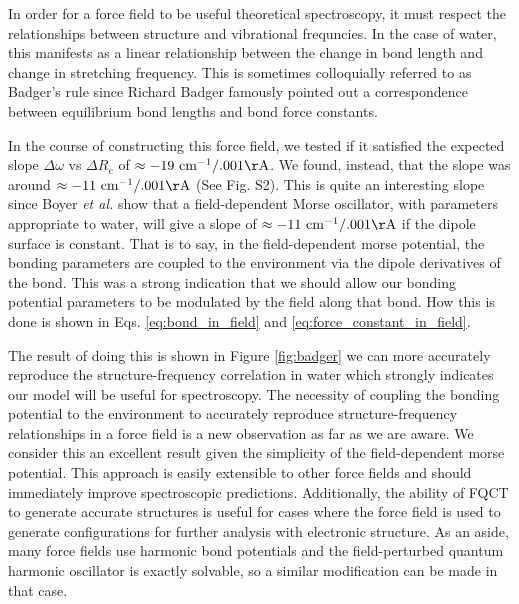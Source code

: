 \documentclass[journal=jacsat,manuscript=article]{achemso}
\begin{document}
In order for a force field to be useful theoretical spectroscopy, it must respect the relationships
between structure and vibrational frequncies. In the case of water, this manifests as a linear
relationship between the change in bond length and change in  stretching frequency.\cite{boyer2019beyond}
This is sometimes colloquially referred to as Badger's rule since Richard Badger famously pointed out a
correspondence between equilibrium bond lengths and bond force constants.\cite{badger1934relation}

In the course of constructing this force field, we tested if it satisfied the expected slope
$\Delta\omega$ vs $\Delta R_e$ of $\approx -19\ \mathrm{cm^{-1}/.001\AA}$\cite{boyer2019beyond}.
We found, instead, that the slope was around $\approx -11\ \mathrm{cm^{-1}/.001\AA}$ (See Fig. S2).
This is quite an interesting slope since Boyer \textit{et al.} show that a field-dependent Morse
oscillator, with parameters appropriate to water, will give a slope of $\approx -11\ \mathrm{cm^{-1}/.001\AA}$
if the dipole surface is constant. That is to say, in the field-dependent morse potential, the
bonding parameters are coupled to the environment via the dipole derivatives of the bond.
This was a strong indication that we should allow our bonding potential parameters to be modulated
by the field along that bond. How this is done is shown in Eqs. \ref{eq:bond_in_field} and \ref{eq:force_constant_in_field}.

The result of doing this is shown in Figure \ref{fig:badger} we can more accurately reproduce the structure-frequency correlation
in water which strongly indicates our model will be useful for spectroscopy. The necessity
of coupling the bonding potential to the environment to accurately reproduce structure-frequency
relationships in a force field is a new observation as far as we are aware. We consider this an
excellent result given the simplicity of the field-dependent morse potential. This approach
is easily extensible to other force fields and should immediately improve spectroscopic predictions.
Additionally, the ability of FQCT to generate accurate structures is useful for cases
where the force field is used to generate configurations for further analysis with electronic structure.
As an aside, many force fields use harmonic bond potentials and the field-perturbed quantum harmonic oscillator
is exactly solvable, so a similar modification can be made in that case.
\end{document}
